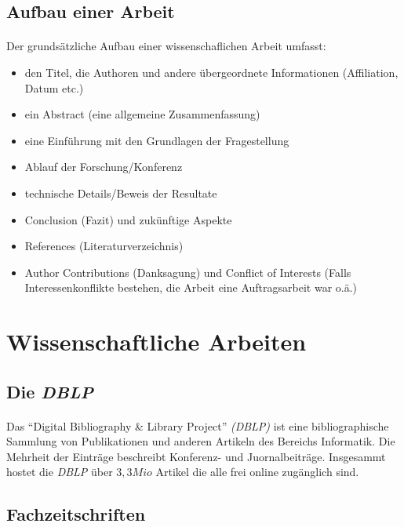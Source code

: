\documentclass[10pt, a4paper]{article}
\begin{document}
\subsection{Aufbau einer Arbeit}
\paragraph{}
Der grundsätzliche Aufbau einer wissenschaflichen Arbeit umfasst:
\begin{itemize}
\item den Titel, die Authoren und andere übergeordnete Informationen (Affiliation, Datum etc.)
\item ein Abstract (eine allgemeine Zusammenfassung)
\item eine Einführung mit den Grundlagen der Fragestellung
\item Ablauf der Forschung/Konferenz
\item technische Details/Beweis der Resultate
\item Conclusion (Fazit) und zukünftige Aspekte
\item References (Literaturverzeichnis)
\item Author Contributions (Danksagung) und Conflict of Interests (Falls Interessenkonflikte bestehen, die Arbeit eine Auftragsarbeit war o.ä.)
\end{itemize}
\par

\section{Wissenschaftliche Arbeiten}
\subsection{Die \textit{DBLP}}
\paragraph{}
Das \enquote{Digital Bibliography \& Library Project} \textit{(DBLP)} ist eine bibliographische Sammlung von Publikationen und anderen Artikeln des Bereichs Informatik. Die Mehrheit der Einträge beschreibt Konferenz- und Juornalbeiträge. Insgesammt hostet die \textit{DBLP} über $3,3Mio$ Artikel die alle frei online zugänglich sind.
\par 

\subsection{Fachzeitschriften}
\end{document}
